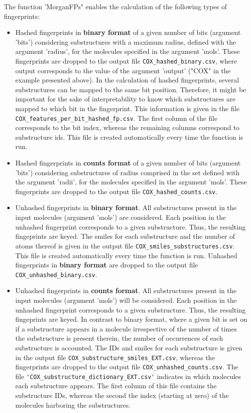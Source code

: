 \documentclass[twoside,a4wide,12pt]{article}\usepackage[]{graphicx}\usepackage[]{color}
\begin{document}
The function 'MorganFPs" enables the calculation of the following types of fingerprints:
\begin{itemize}

\item Hashed fingerprints in {\bf binary format} of a given number of bits (argument 'bits') considering substructures with a maximum radius, defined with the argument 'radius', for the molecules specified in the argument 'mols'. These fingerprints are dropped to the output file \verb|COX_hashed_binary.csv|, where output corresponds to the value of the argument 'output' ("COX" in the example presented above). 
In the calculation of hashed fingerprints, several substructures can be mapped to the same bit position.
Therefore, it might be important for the sake of interpretability to know which substructures are mapped to which bit in the fingerprint. This information is given in the file \verb|COX_features_per_bit_hashed_fp.csv|.
The first column of the file corresponds to the bit index, whereas the remaining columns correspond to substructure ids.
This file is created automatically every time the function is run.

\item Hashed fingerprints in {\bf counts format} of a given number of bits (argument 'bits') considering substructures of radius comprised in the set defined with the argument 'radii', for the molecules specified in the argument 'mols'. These fingerprints are dropped to the output file \verb|COX_hashed_counts.csv|.

\item Unhashed fingerprints in {\bf binary format}. All substructures present in the input molecules (argument 'mols') are considered. Each position in the unhashed fingerprint corresponds to a given substructure. Thus, the resulting fingeprints are keyed. The smiles for each substructure and the number of atoms thereof is given in the output file \verb|COX_smiles_substructures.csv|. This file is created automatically every time the function is run. 
Unhashed fingerprints in {\bf binary format} are dropped to the output file \verb|COX_unhashed_binary.csv|.

\item Unhashed fingerprints in {\bf counts format}. All substructures present in the input molecules (argument 'mols') will be considered. Each position in the unhashed fingerprint corresponds to a given substructure. Thus, the resulting fingeprints are keyed. In contrast to binary format, where a given bit is set on if a substructure appears in a molecule irrespective of the number of times the substructure is present therein, the number of occurrences of each substructure is accounted. 
The IDs and smiles for each substructure is given in the output file \verb|COX_substructure_smiles_EXT.csv|,  whereas the fingerprints are dropped to the output file \verb|COX_unhashed_counts.csv|.
The file \verb|'COX_substructure_dictionary_EXT.csv'| indicates in which molecules each substructure appears. The first column
of this file contains the substructure IDs, whereas the second the index (starting at zero) of the molecules harboring the substructures.


\end{itemize}
\end{document}

